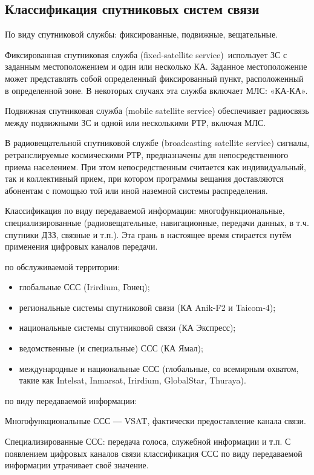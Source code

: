\documentclass[14pt,a4paper,oneside]{extarticle}
\begin{document}
\subsection{Классификация спутниковых систем связи} 

По виду спутниковой службы: фиксированные, подвижные, вещательные.

Фиксированная спутниковая служба (fixed-satellite service) использует ЗС с заданным местоположением и один или несколько КА. Заданное местоположение может представлять собой определенный фиксированный пункт, расположенный в определенной зоне. В некоторых случаях эта служба включает МЛС: «КА-КА».

Подвижная спутниковая служба (mobile satellite service)  обеспечивает радиосвязь между подвижными ЗС и одной или несколькими РТР, включая МЛС.

В радиовещательной спутниковой службе (broadcasting satellite service) сигналы, ретранслируемые космическими РТР, предназначены для непосредственного приема населением. При этом непосредственным считается как индивидуальный, так и коллективный прием, при котором программы вещания доставляются абонентам с помощью той или иной наземной системы распределения.

Классификация по виду передаваемой информации: многофункциональные, специализированные (радиовещательные, навигационные, передачи данных, в т.ч. спутники ДЗЗ, связные и т.п.). Эта грань в настоящее время стирается путём применения цифровых каналов передачи.

по обслуживаемой территории:

\begin{itemize}
    \item глобальные ССС (Irirdium, Гонец);
    \item региональные системы спутниковой связи (КА Anik-F2 и Taicom-4);
    \item национальные системы спутниковой связи (КА Экспресс);
    \item ведомственные (и специальные) ССС (КА Ямал);
    \item международные и национальные ССС (глобальные, со всемирным охватом, такие как Intelsat, Inmarsat, Irirdium, GlobalStar, Thuraya).
\end{itemize}

по виду передаваемой информации:

Многофункциональные ССС ― VSAT, фактически предоставление канала связи.

Специализированные ССС: передача голоса, служебной информации и т.п. С появлением цифровых каналов связи классификация ССС по виду передаваемой информации  утрачивает своё значение.
\end{document}
